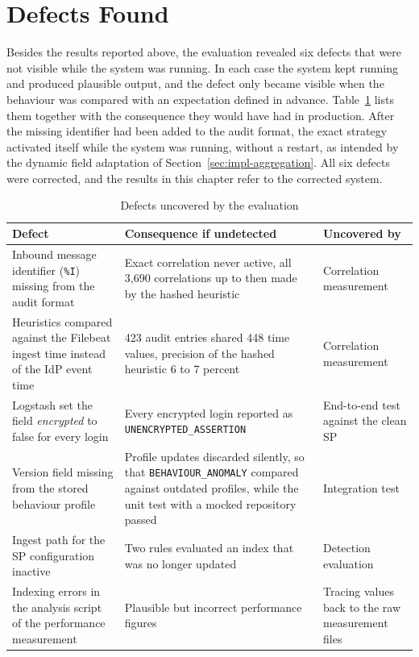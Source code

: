 \documentclass[../main.tex]{subfiles}
\begin{document}
\section{Defects Found}\label{sec:defects}

Besides the results reported above, the evaluation revealed six defects that were not visible 
while the system was running. 
In each case the system kept running and produced plausible output, and the defect only became 
visible when the behaviour was compared with an expectation defined in advance. 
Table~\ref{tab:defects} lists them together with the consequence they would have had in production. 
After the missing identifier had been added to the audit format, the exact strategy activated 
itself while the system was running, without a restart, as intended by the dynamic field adaptation 
of Section~\ref{sec:impl-aggregation}. 
All six defects were corrected, and the results in this chapter refer to the corrected system. 

\begin{table}[h]
\centering
\caption{Defects uncovered by the evaluation}\label{tab:defects}
\small
\begin{tabularx}{\textwidth}{@{}>{\raggedright\arraybackslash}X>{\raggedright\arraybackslash}X>{\raggedright\arraybackslash}p{3.2cm}@{}}
\toprule
Defect & Consequence if undetected & Uncovered by \\
\midrule
Inbound message identifier (\texttt{\%I}) missing from the audit format 
  & Exact correlation never active, all 3{,}690 correlations up to then made by the hashed heuristic 
  & Correlation measurement \\
Heuristics compared against the Filebeat ingest time instead of the IdP event time 
  & 2{,}423 audit entries shared 448 time values, precision of the hashed heuristic 6 to 7 percent 
  & Correlation measurement \\
Logstash set the field \textit{encrypted} to false for every login 
  & Every encrypted login reported as \texttt{UNENCRYPTED\_\allowbreak{}ASSERTION} 
  & End-to-end test against the clean SP \\
Version field missing from the stored behaviour profile 
  & Profile updates discarded silently, so that \texttt{BEHAVIOUR\_\allowbreak{}ANOMALY} compared against outdated profiles, while the unit test with a mocked repository passed 
  & Integration test \\
Ingest path for the SP configuration inactive 
  & Two rules evaluated an index that was no longer updated 
  & Detection evaluation \\
Indexing errors in the analysis script of the performance measurement 
  & Plausible but incorrect performance figures 
  & Tracing values back to the raw measurement files \\
\bottomrule
\end{tabularx}
\end{table}
\end{document}
